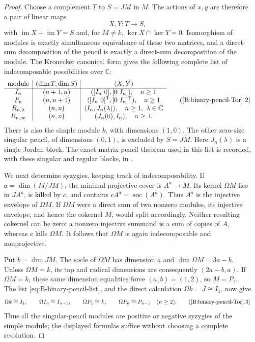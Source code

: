 \begin{proof}
Choose a complement $T$ to $S=JM$ in $M$.  The actions of $x,y$
are therefore a pair of linear maps
\[
 X,Y:T\longrightarrow S,
\]
with $\operatorname{im}X+\operatorname{im}Y=S$ and, for $M\ne k$,
$\ker X\cap\ker Y=0$.
Isomorphism of modules is exactly simultaneous equivalence of
these two matrices, and a direct-sum decomposition of the pencil
is exactly a direct-sum decomposition of the module.
The Kronecker canonical form gives the following complete list
of indecomposable possibilities over $\mathbb C$:
\[
\begin{array}{c|c|c}
 \text{module}&(\dim T,\dim S)&(X,Y)\\ \hline
 I_n&(n+1,n)&([I_n\ 0],[0\ I_n]),\quad n\geq1\\
 P_n&(n,n+1)&([I_n\ 0]^{\mathsf T},[0\ I_n]^{\mathsf T}),
                         \quad n\geq1\\
 R_{n,\lambda}&(n,n)&(I_n,J_n(\lambda)),
                         \quad n\geq1,\ \lambda\in\mathbb C\\
 R_{n,\infty}&(n,n)&(J_n(0),I_n),\quad n\geq1.
\end{array}                                                \tag{\ref{B:binary-pencil-Tor}.2}\label{eq:B-binary-pencil-list}
\]
There is also the simple module $k$, with dimensions $(1,0)$.
The other zero-size singular pencil, of dimensions $(0,1)$,
is excluded by $S=JM$.
Here $J_n(\lambda)$ is a single Jordan block.  The exact matrix
pencil theorem used in this list is recorded, with these singular
and regular blocks, in
\cite[Theorem~2.1, p.~221]{deterandmytryshyndopico2024}.

We next determine syzygies, keeping track of indecomposability.
If $a=\dim(M/JM)$, the minimal projective cover is $A^a\to M$.
Its kernel $\Omega M$ lies in $JA^a$, is killed by $c$, and
contains $cA^a=\operatorname{soc}(A^a)$.  Thus $A^a$ is the
injective envelope of $\Omega M$.  If $\Omega M$ were a direct
sum of two nonzero modules, its injective envelope, and hence
the cokernel $M$, would split accordingly.  Neither resulting
cokernel can be zero: a nonzero injective summand is a sum of
copies of $A$, whereas $c$ kills $\Omega M$.
It follows that $\Omega M$ is again indecomposable and
nonprojective.

Put $b=\dim JM$.  The socle of $\Omega M$ has dimension $a$
and $\dim\Omega M=3a-b$.  Unless $\Omega M=k$, its top and
radical dimensions are consequently $(2a-b,a)$.
If $\Omega M=k$, these same dimension equalities force
$(a,b)=(1,2)$, so $M=P_1$.
The list \eqref{eq:B-binary-pencil-list}, and the direct
calculation $\Omega k=J\cong I_1$,
now give
\[
 \Omega k\cong I_1,\qquad
 \Omega I_n\cong I_{n+1},\qquad
 \Omega P_1\cong k,\qquad
 \Omega P_n\cong P_{n-1}\quad(n\geq2).                     \tag{\ref{B:binary-pencil-Tor}.3}\label{eq:B-binary-string-syzygies}
\]
Thus all the singular-pencil modules are positive or negative
syzygies of the simple module; the displayed formulas suffice
without choosing a complete resolution.


\end{proof}
